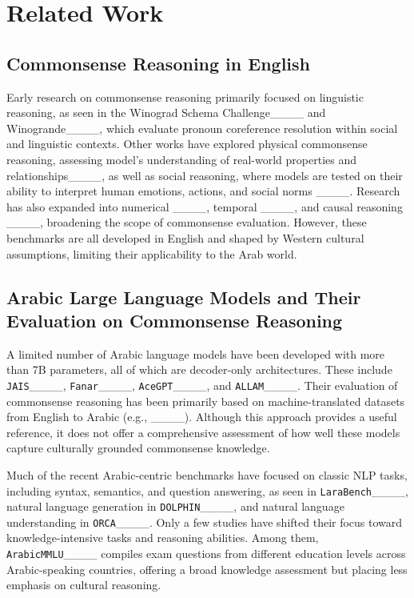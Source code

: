 \section{Related Work}
\subsection{Commonsense Reasoning in English} 


Early research on commonsense reasoning primarily focused on linguistic reasoning, as seen in the Winograd Schema Challenge____ and Winogrande____, which evaluate pronoun coreference resolution within social and linguistic contexts. Other works have explored physical commonsense reasoning, assessing model's understanding of real-world properties and relationships____, as well as social reasoning, where models are tested on their ability to interpret human emotions, actions, and social norms ____. Research has also expanded into numerical ____, temporal ____, and causal reasoning ____, broadening the scope of commonsense evaluation. However, these benchmarks are all developed in English and shaped by Western cultural assumptions, limiting their applicability to the Arab world.

\subsection{Arabic Large Language Models and Their Evaluation on Commonsense Reasoning}
A limited number of Arabic language models have been developed with more than 7B parameters, all of which are decoder-only architectures. These include \texttt{JAIS}____, \texttt{Fanar}____, \texttt{AceGPT}____, and \texttt{ALLAM}____. Their evaluation of commonsense reasoning has been primarily based on machine-translated datasets from English to Arabic (e.g., ____). Although this approach provides a useful reference, it does not offer a comprehensive assessment of how well these models capture culturally grounded commonsense knowledge.

Much of the recent Arabic-centric benchmarks have focused on classic NLP tasks, including syntax, semantics, and question answering, as seen in \texttt{LaraBench}____, natural language generation in \texttt{DOLPHIN}____, and natural language understanding in \texttt{ORCA}____. Only a few studies have shifted their focus toward knowledge-intensive tasks and reasoning abilities. Among them, \texttt{ArabicMMLU}____ compiles exam questions from different education levels across Arabic-speaking countries, offering a broad knowledge assessment but placing less emphasis on cultural reasoning. 

